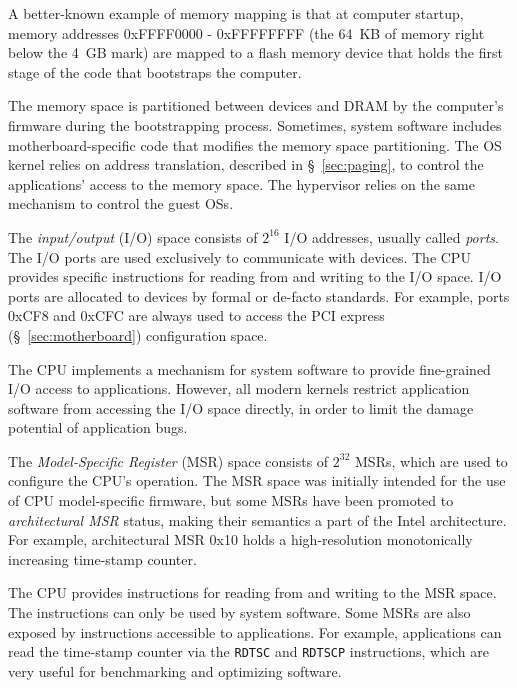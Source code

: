 A better-known example of memory mapping is that at computer startup, memory
addresses 0xFFFF0000 - 0xFFFFFFFF (the 64~KB of memory right below the 4~GB
mark) are mapped to a flash memory device that holds the first stage of the
code that bootstraps the computer.

The memory space is partitioned between devices and DRAM by the computer's
firmware during the bootstrapping process. Sometimes, system software includes
motherboard-specific code that modifies the memory space partitioning. The OS
kernel relies on address translation, described in \S~\ref{sec:paging}, to
control the applications' access to the memory space. The hypervisor relies on
the same mechanism to control the guest OSs.


The \textit{input/output} (I/O) space consists of $2^{16}$ I/O addresses,
usually called \textit{ports}. The I/O ports are used exclusively to
communicate with devices. The CPU provides specific instructions for reading
from and writing to the I/O space. I/O ports are allocated to devices by formal
or de-facto standards. For example, ports 0xCF8 and 0xCFC are always used to
access the PCI express (\S~\ref{sec:motherboard}) configuration space.

The CPU implements a mechanism for system software to provide fine-grained I/O
access to applications. However, all modern kernels restrict application
software from accessing the I/O space directly, in order to limit the damage
potential of application bugs.


The \textit{Model-Specific Register} (MSR) space consists of $2^{32}$ MSRs,
which are used to configure the CPU's operation. The MSR space was initially
intended for the use of CPU model-specific firmware, but some MSRs have been
promoted to \textit{architectural MSR} status, making their semantics a part of
the Intel architecture. For example, architectural MSR 0x10 holds a
high-resolution monotonically increasing time-stamp counter.

The CPU provides instructions for reading from and writing to the MSR space.
The instructions can only be used by system software. Some MSRs are also
exposed by instructions accessible to applications. For example, applications
can read the time-stamp counter via the \texttt{RDTSC} and \texttt{RDTSCP}
instructions, which are very useful for benchmarking and optimizing software.
